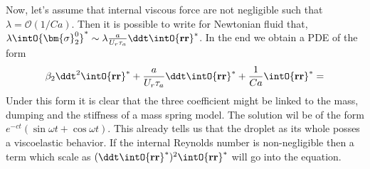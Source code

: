 Now, let's assume that internal viscous force are not negligible such that $\lambda = \mathcal{O}(1/Ca)$. 
Then it is possible to write for Newtonian fluid that, $\lambda  \intO{\bm{\sigma}_2^0}^*\sim \lambda  \frac{a}{U_r \tau_a}\ddt \intO{\textbf{rr}}^*$. 
In the end we obtain a PDE of the form 
\begin{equation}
    {\beta_2}
    \ddt^2  \intO{\textbf{r} \textbf{r}}^*
    + \frac{a}{U_r \tau_a}\ddt \intO{\textbf{rr}}^*
    + \frac{1}{Ca} \intO{ \textbf{rr}}^*
    = 
\end{equation}
Under this form it is clear that the three coefficient might be linked to the mass, dumping and the stiffness of a mass spring model. 
The solution wil be of the form $e^{-ct}(\sin \omega t+ \cos \omega t)$. 
This already tells us that the droplet as its whole posses a viscoelastic behavior.
If the internal Reynolds number is non-negligible then a term which scale as $(\ddt \intO{\textbf{rr}}^*)^2  \intO{\textbf{rr}}^*$ will go into the equation. 


